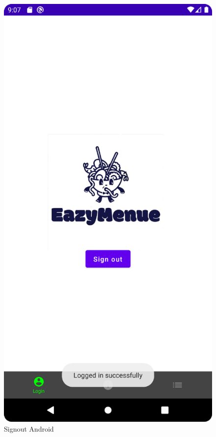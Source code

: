 \begin{figure}[htp]
    \centering
    \author{Bozidar Spasenovic}
    \includegraphics[scale=0.09]{pics/SignOutScreenAnndroid.png}
    \caption{Signout Android}
    \label{fig:impl:SignOutScreenAnndroid}
\end{figure}

